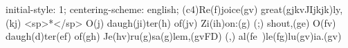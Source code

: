 initial-style: 1;
centering-scheme: english;
(c4)Re(f)joice(gv) great(gjkvJIjkjk)ly,(kj) <sp>*</sp> O(j) daugh(ji)ter(h) of(jv) Zi(ih)on:(g) (;) shout,(ge) O(fv) daugh(d)ter(ef) of(gh) Je(hv)ru(g)sa(g)lem,(gvFD) (,) al(fe~)le(fg)lu(gv)ia.(gv)
